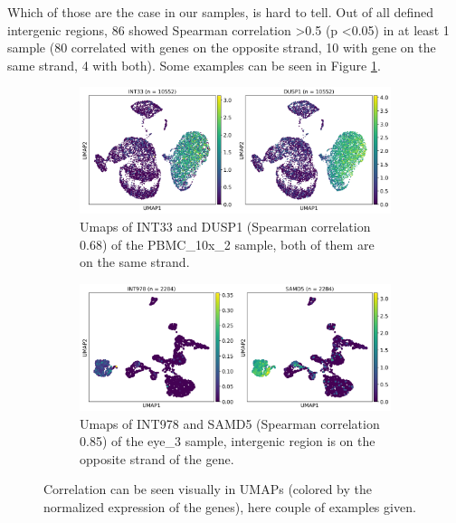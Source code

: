 Which of those are the case in our samples, is hard to tell.
Out of all defined intergenic regions, 86 showed Spearman correlation \textgreater 0.5 (p \textless 0.05) in at least 1 sample
(80 correlated with genes on the opposite strand, 10 with gene on the same strand, 4 with both).
Some examples can be seen in Figure \ref{fig:correlationUmaps}.

\begin{figure}[htbp]
    \centering
    \begin{subfigure}{\textwidth}
        \centering
        \includegraphics[width=\textwidth]{images/correlationUmaps/PBMC_10x_2_DUSP1.png}
        \caption{Umaps of INT33 and DUSP1 (Spearman correlation 0.68) of the PBMC\_10x\_2 sample, both of them are on the same strand.}
    \end{subfigure}
    \vspace{0.5em}
    \begin{subfigure}{\textwidth}
        \centering
        \includegraphics[width=\textwidth]{images/correlationUmaps/eye_3_SAMD5.png}
        \caption{Umaps of INT978 and SAMD5 (Spearman correlation 0.85) of the eye\_3 sample,
        intergenic region is on the opposite strand of the gene.}
    \end{subfigure}
    \caption{Correlation can be seen visually in UMAPs (colored by the normalized expression of the genes), here couple of examples given.}
    \label{fig:correlationUmaps}
\end{figure}

